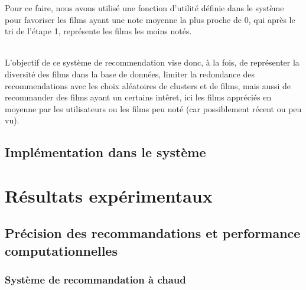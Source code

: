 \documentclass{article}
\begin{document}
\begin{itemize}
\begin{enumerate}
                    Pour ce faire, nous avons utilisé une fonction d'utilité définie dans le système pour favoriser les films ayant une note moyenne la plus proche de 0, qui après le tri de l'étape 1, représente les films les moins notés.
          \end{enumerate}
          $ $\\
          L'objectif de ce système de recommendation vise donc, à la fois, de représenter la diversité des films dans la base de données, limiter la redondance des recommendations avec les choix aléatoires de clusters et de films, mais aussi de recommander des films
          ayant un certains intêret, ici les films appréciés en moyenne par les utilisateurs ou les films peu noté (car possiblement récent ou peu vu).\\

\end{itemize}


\subsection{Implémentation dans le système}
\section{Résultats expérimentaux}
\subsection{Précision des recommandations et performance computationnelles}
\subsubsection{Système de recommandation à chaud}
$ $\\
\\
\\
\\
\\
\\
\\
\\
\end{document}
